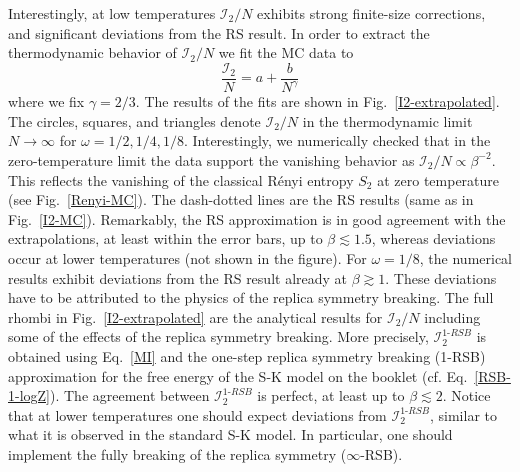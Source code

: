 \documentclass[twocolumn,superscriptaddress,prb,10pt]{revtex4-1}
\begin{document}
Interestingly, at low temperatures ${\mathcal I}_2/N$ exhibits strong finite-size corrections, and 
significant deviations from the RS result. 
In order to extract the thermodynamic behavior of ${\mathcal I}_2/N$ we fit the MC data to 
%
\begin{equation}
\frac{{\mathcal I}_2}{N}=a+\frac{b}{N^\gamma}
\end{equation}
%
where we fix $\gamma=2/3$. The results of the fits are shown in Fig.~\ref{I2-extrapolated}. 
The circles, squares, and triangles denote ${\mathcal I}_2/N$ in the thermodynamic limit 
$N\to\infty$ for $\omega=1/2,1/4,1/8$. 
Interestingly, we numerically checked that in the zero-temperature limit the data 
support the vanishing behavior as ${\mathcal I}_2/N\propto \beta^{-2}$. This reflects 
the vanishing of the classical R\'enyi entropy $S_2$ at zero temperature (see Fig.~\ref{Renyi-MC}).
The dash-dotted lines are the RS results (same as 
in Fig.~\ref{I2-MC}). Remarkably, the RS approximation is in good agreement with 
the extrapolations, at least within the error bars, up to $\beta\lesssim 1.5$, whereas 
deviations occur at lower temperatures (not shown in the figure). For $\omega=1/8$, 
the numerical results exhibit deviations from the RS result already at $\beta\gtrsim 1$. 
These deviations have to be attributed to the physics of the replica symmetry breaking. 
The full rhombi in Fig.~\ref{I2-extrapolated} are the analytical results for ${\mathcal I}_2/N$ 
including some of the effects of the replica symmetry breaking. More precisely, 
${\mathcal I}_2^{1\textrm{-}RSB}$ is obtained using Eq.~\eqref{MI} and the one-step replica 
symmetry breaking (1-RSB) approximation for the free energy of the S-K model on the 
booklet (cf. Eq.~\eqref{RSB-1-logZ}). The agreement between ${\mathcal I}_2^{1\textrm{-}RSB}$ 
is perfect, at least up to $\beta\lesssim 2$. Notice that at lower temperatures 
one should expect deviations from ${\mathcal I}_2^{1\textrm{-}RSB}$, similar to what it 
is observed in the standard S-K model. In particular, one should implement the fully 
breaking of the replica symmetry ($\infty$-RSB).
 
\end{document}
